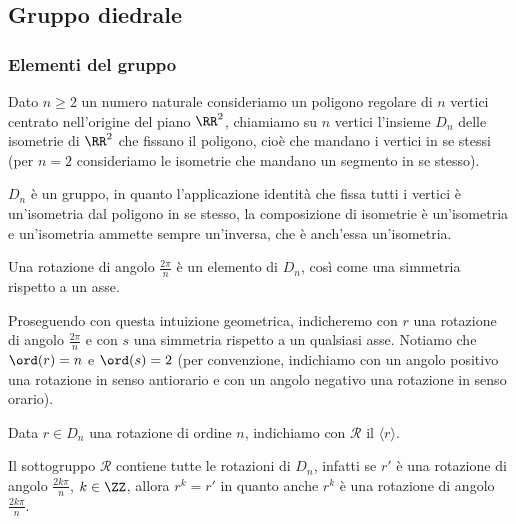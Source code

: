 \documentclass[11pt]{scrartcl}
\begin{document}
\newpage

\subsection{Gruppo diedrale}

\subsubsection{Elementi del gruppo}

\begin{definition}
    Dato $n \geqslant 2$ un numero naturale consideriamo un poligono regolare di $n$ vertici
    centrato nell'origine del piano $\RR^2$,
    chiamiamo  su $n$ vertici l'insieme $D_n$
    delle isometrie di $\RR^2$ che fissano il poligono, cioè che mandano i 
    vertici in se stessi (per $n = 2$ consideriamo le isometrie che mandano un 
    segmento in se stesso).
\end{definition}

\begin{remark}
    $D_n$ è un gruppo, in quanto l'applicazione identità che 
    fissa tutti i vertici è un'isometria dal poligono in se stesso, la 
    composizione di isometrie è un'isometria e un'isometria ammette sempre 
    un'inversa, che è anch'essa un'isometria.
\end{remark}

\begin{remark}
    Una rotazione di angolo $\displaystyle\frac{2\pi}{n}$ è un elemento di $D_n$,
    così come una simmetria rispetto a un asse.
\end{remark}

Proseguendo con questa intuizione geometrica, indicheremo con $r$ una rotazione
di angolo $\displaystyle \frac{2\pi}{n}$ e con $s$ una simmetria rispetto a
un qualsiasi asse. Notiamo che $\ord(r) = n$ e $\ord(s) = 2$ (per convenzione, 
indichiamo con un angolo positivo una rotazione in senso antiorario e con un 
angolo negativo una rotazione in senso orario).

\begin{definition}
    Data $r \in D_n$ una rotazione di ordine $n$, indichiamo con $\mathcal{R}$ il
     $\langle r\rangle$.
\end{definition}

\begin{remark}
    Il sottogruppo $\mathcal{R}$ contiene tutte le rotazioni di $D_n$, infatti
    se $r'$ è una rotazione di angolo $\displaystyle\frac{2k\pi}{n}$, $k \in \ZZ$,
    allora $r^k = r'$ in quanto anche $r^k$ è una rotazione di angolo 
    $\displaystyle\frac{2k\pi}{n}$.
\end{remark}
\end{document}
